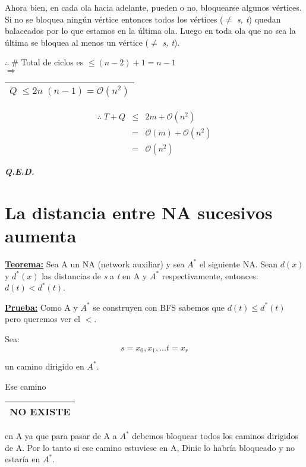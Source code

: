 \documentclass[12pt,a4paper]{report}
\newcounter{neq}
\newcommand{\QED}{\hfill \textit{\textbf{Q.E.D.}}}
\begin{document}
				\par Ahora bien, en cada ola hacia adelante, pueden o no, bloquearse algunos vértices. Si no se bloquea ningún vértice entonces todos los vértices ($\neq$ \textit{s, t}) quedan balaceados por lo que estamos en la última ola. Luego en toda ola que no sea la última se bloquea al menos un vértice ($\neq$ \textit{s, t}).
				\begin{center}
					$\therefore \; \#$ Total de ciclos es $\leq (n - 2) + 1 = n - 1$ \\
					\vspace{3mm}
					$\Rightarrow$ \begin{tabular}{|c|} \hline $Q \; \leq 2 n \; (n - 1) = \mathcal{O}(n^{2})$ \\ \hline \end{tabular}
				\end{center}

				\begin{eqnarray}
					\nonumber \therefore \; T + Q &\leq & 2 m + \mathcal{O}(n^{2}) \\
					\nonumber &=& \mathcal{O}(m) + \mathcal{O}(n^{2}) \\
					\nonumber &=& \mathcal{O}(n^{2})
				\end{eqnarray}

		\QED

	\section{La distancia entre NA sucesivos aumenta}
		\textbf{\underline{Teorema:}} Sea A un NA (network auxiliar) y sea $A^{*}$ el siguiente NA. Sean $d(x)$ y $d^{*}(x)$ las distancias de \textit{s} a \textit{t} en A y $A^{*}$ respectivamente, entonces: $d(t) < d^{*}(t)$.

		\textbf{\underline{Prueba:}} Como A y $A^{*}$ se construyen con BFS sabemos que $d(t) \leq d^{*}(t)$ pero queremos ver el $<$.
			\par Sea:
			\[ s = x_{0}, x_{1}, \dotsc t = x_{r} \]
			\par un camino dirigido en $A^{*}$.
			\par Ese camino \begin{tabular}{|c|} \hline NO EXISTE \\\hline \end{tabular} en A ya que para pasar de A a $A^{*}$ debemos bloquear todos los caminos dirigidos de A. Por lo tanto si ese camino estuviese en A, Dinic lo habría bloqueado y no estaría en $A^{*}$.
\end{document}
